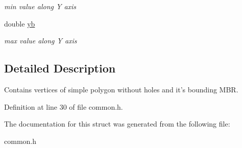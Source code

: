 \begin{DoxyCompactItemize}
\begin{DoxyCompactList}\small\item\em min value along Y axis \end{DoxyCompactList}\item 
\hypertarget{structSigSpatial2013_1_1Ring_a6b2f395698fc3585027ddacf363518a8}{double \hyperlink{structSigSpatial2013_1_1Ring_a6b2f395698fc3585027ddacf363518a8}{yb}}\label{structSigSpatial2013_1_1Ring_a6b2f395698fc3585027ddacf363518a8}

\begin{DoxyCompactList}\small\item\em max value along Y axis \end{DoxyCompactList}\end{DoxyCompactItemize}


\subsection{Detailed Description}
Contains vertices of simple polygon without holes and it's bounding M\-B\-R. 

Definition at line 30 of file common.\-h.



The documentation for this struct was generated from the following file\-:\begin{DoxyCompactItemize}
\item 
common.\-h\end{DoxyCompactItemize}
